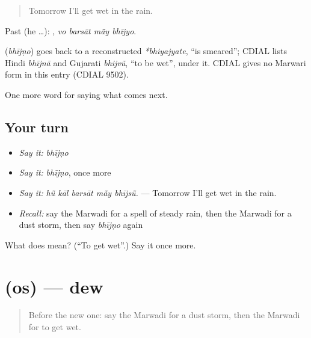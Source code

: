 \begin{quote}
Tomorrow I'll get wet in the rain.
\end{quote}

Past (he …):    , \emph{vo barsāt mā̃y bhījyo}.

\begin{cousinweb}
\textbf{} (\emph{bhījṇo}) goes back to a reconstructed \emph{*bhiyajyate}, \textquotedblleft{}is smeared\textquotedblright{}; CDIAL lists Hindi \emph{bhījnā} and Gujarati \emph{bhijvũ}, \textquotedblleft{}to be wet\textquotedblright{}, under it. CDIAL gives no Marwari form in this entry (CDIAL 9502).
\end{cousinweb}

\begin{grammarlens}[title={What you've built}]
One more word for saying what comes next.
\end{grammarlens}

\subsection*{Your turn}
\begin{itemize}
\raggedright
  \item \emph{Say it:} \emph{bhījṇo}
  \item \emph{Say it:} \emph{bhījṇo}, once more
  \item \emph{Say it:} \emph{hū̃ kāl barsāt mā̃y bhījsū̃.} — Tomorrow I'll get wet in the rain.
  \item \emph{Recall:} say the Marwadi for a spell of steady rain, then the Marwadi for a dust storm, then say \emph{bhījṇo} again
\end{itemize}

\begin{tcolorbox}[breakable,colback=teal!4,colframe=teal!35!black,title={Before you move on}]
What does  mean? (\textquotedblleft{}To get wet\textquotedblright{}.) Say it once more.
\end{tcolorbox}
\section[\texorpdfstring{\mw{ओस} (os)}{ओस (os)}]{ (os) — dew}

\label{lesson:MW-C222-os}



\begin{quote}
Before the new one: say the Marwadi for a dust storm, then the Marwadi for to get wet.
\end{quote}

